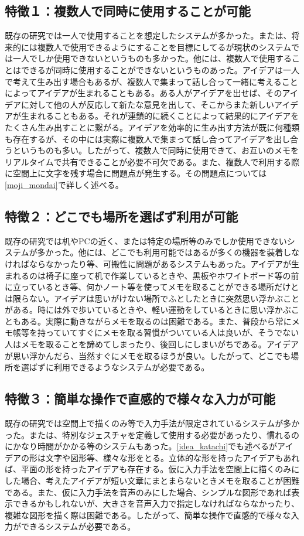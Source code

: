 \documentclass[11pt,a4j, titlepage]{jarticle} %
\begin{document}
\subsection*{特徴１：複数人で同時に使用することが可能}
既存の研究では一人で使用することを想定したシステムが多かった。または、将来的には複数人で使用できるようにすることを目標にしてるが現状のシステムでは一人でしか使用できないというものも多かった。他には、複数人で使用することはできるが同時に使用することができないというものあった。アイデアは一人で考えて生み出す場合もあるが、複数人で集まって話し合って一緒に考えることによってアイデアが生まれることもある。ある人がアイデアを出せば、そのアイデアに対して他の人が反応して新たな意見を出して、そこからまた新しいアイデアが生まれることもある。それが連鎖的に続くことによって結果的にアイデアをたくさん生み出すことに繋がる。アイデアを効率的に生み出す方法が既に何種類も存在するが、その中には実際に複数人で集まって話し合ってアイデアを出し合うというものも多い。したがって、複数人で同時に使用できて、お互いのメモをリアルタイムで共有できることが必要不可欠である。また、複数人で利用する際に空間上に文字を残す場合に問題点が発生する。その問題点については\ref{moji_mondai}で詳しく述べる。

\subsection*{特徴２：どこでも場所を選ばず利用が可能}
既存の研究では机やPCの近く、または特定の場所等のみでしか使用できないシステムが多かった。他には、どこでも利用可能ではあるが多くの機器を装着しなければならなかったり等、可搬性に問題があるシステムもあった。アイデアが生まれるのは椅子に座って机で作業しているときや、黒板やホワイトボード等の前に立っているとき等、何かノート等を使ってメモを取ることができる場所だけとは限らない。アイデアは思いがけない場所でふとしたときに突然思い浮かぶことがある。時には外で歩いているときや、軽い運動をしているときに思い浮かぶこともある。実際に動きながらメモを取るのは困難である。また、普段から常にメモ帳等を持っていてすぐにメモを取る習慣がついている人は良いが、そうでない人はメモを取ることを諦めてしまったり、後回しにしまいがちである。アイデアが思い浮かんだら、当然すぐにメモを取るほうが良い。したがって、どこでも場所を選ばずに利用できるようなシステムが必要である。

\subsection*{特徴３：簡単な操作で直感的で様々な入力が可能}
既存の研究では空間上で描くのみ等で入力手法が限定されているシステムが多かった。または、特別なジェスチャを定義して使用する必要があったり、慣れるのにかなり時間がかかる等のシステムもあった。\ref{idea_katachi}でも述べるがアイデアの形は文字や図形等、様々な形をとる。立体的な形を持ったアイデアもあれば、平面の形を持ったアイデアも存在する。仮に入力手法を空間上に描くのみにした場合、考えたアイデアが短い文章にまとまらないときメモを取ることが困難である。また、仮に入力手法を音声のみにした場合、シンプルな図形であれば表示できるかもしれないが、大きさを音声入力で指定しなければならなかったり、複雑な図形を描く際は困難である。したがって、簡単な操作で直感的で様々な入力ができるシステムが必要である。
\end{document}

